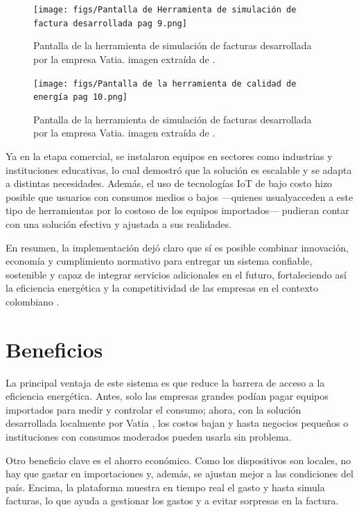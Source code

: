 \begin{figure}[h!]
\centering
\texttt{[image: figs/Pantalla de Herramienta de simulación de factura desarrollada pag 9.png]}
\caption{Pantalla de la herramienta de simulación de facturas desarrollada por la empresa Vatia. imagen extraída de \cite[pag.~9]{Jaramillo2022}.}
\label{fig:factura}
\end{figure}

\begin{figure}[h!]
\centering
\texttt{[image: figs/Pantalla de la herramienta de calidad de energía pag 10.png]}
\caption{Pantalla de la herramienta de simulación de facturas desarrollada por la empresa Vatia. imagen extraída de \cite[pag.~10]{Jaramillo2022}.}
\label{fig:factura0}
\end{figure}

Ya en la etapa comercial, se instalaron equipos en sectores como industrias y instituciones educativas, lo cual demostró que la solución es escalable y se adapta a distintas necesidades. Además, el uso de tecnologías IoT de bajo costo hizo posible que usuarios con consumos medios o bajos —quienes usualyacceden a este tipo de herramientas por lo costoso de los equipos importados— pudieran contar con una solución efectiva y ajustada a sus realidades.

En resumen, la implementación dejó claro que sí es posible combinar innovación, economía y cumplimiento normativo para entregar un sistema confiable, sostenible y capaz de integrar servicios adicionales en el futuro, fortaleciendo así la eficiencia energética y la competitividad de las empresas en el contexto colombiano \cite{Jaramillo2022}.

\section{Beneficios}
La principal ventaja de este sistema es que reduce la barrera de acceso a la eficiencia energética. Antes, solo las empresas grandes podían pagar equipos importados para medir y controlar el consumo; ahora, con la solución desarrollada localmente por Vatia \cite{Jaramillo2022}, los costos bajan y hasta negocios pequeños o instituciones con consumos moderados pueden usarla sin problema.

Otro beneficio clave es el ahorro económico. Como los dispositivos son locales, no hay que gastar en importaciones y, además, se ajustan mejor a las condiciones del país. Encima, la plataforma muestra en tiempo real el gasto y hasta simula facturas, lo que ayuda a gestionar los gastos y a evitar sorpresas en la factura.

